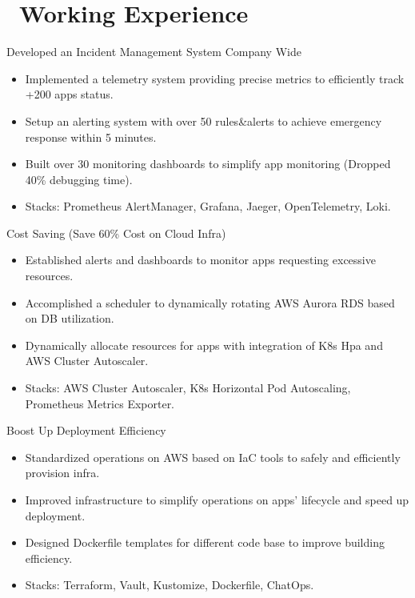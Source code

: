 \documentclass{resume}
\begin{document}
\section{\faUsers\ Working Experience}
Developed an Incident Management System Company Wide
\begin{itemize}
  \item Implemented a telemetry system providing precise metrics to efficiently track +200 apps status.
  \item Setup an alerting system with over 50 rules\&alerts to achieve emergency response within 5 minutes.
  \item Built over 30 monitoring dashboards to simplify app monitoring (Dropped 40\% debugging time).
  \item Stacks: Prometheus AlertManager, Grafana, Jaeger, OpenTelemetry, Loki.
\end{itemize}

Cost Saving (Save 60\% Cost on Cloud Infra)
\begin{itemize}
  \item Established alerts and dashboards to monitor apps requesting excessive resources.
  \item Accomplished a scheduler to dynamically rotating AWS Aurora RDS based on DB utilization.
  \item Dynamically allocate resources for apps with integration of K8s Hpa and AWS Cluster Autoscaler.
  \item Stacks: AWS Cluster Autoscaler, K8s Horizontal Pod Autoscaling, Prometheus Metrics Exporter.
\end{itemize}

Boost Up Deployment Efficiency
\begin{itemize}
  \item Standardized operations on AWS based on IaC tools to safely and efficiently provision infra.
  \item Improved infrastructure to simplify operations on apps' lifecycle and speed up deployment.
  \item Designed Dockerfile templates for different code base to improve building efficiency.
  \item Stacks: Terraform, Vault, Kustomize, Dockerfile, ChatOps.
\end{itemize}
\end{document}
